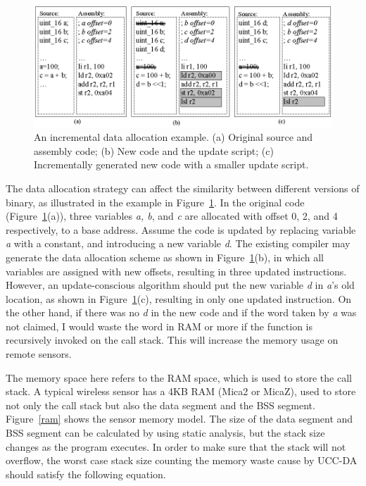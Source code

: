 \begin{figure}[htbp]
\centering
\includegraphics[width=5.5in]{figures/fdata.0.eps}
\caption[An example of incremental data allocation.]{An incremental data allocation example.
(a) Original source and assembly code;
(b) New code and the update script;
(c) Incrementally generated new code with a smaller update script.}
\label{fdata.0}
\end{figure}

The data allocation
strategy can affect the similarity between different versions of
binary, as illustrated in the example in Figure~\ref{fdata.0}.  In the
original code (Figure~\ref{fdata.0}(a)), three variables {\it a, b},
and {\it c} are allocated with offset 0, 2, and 4 respectively, to a
base address. Assume the code is updated by replacing variable {\it a}
with a constant, and introducing a new variable {\it d}. The existing
compiler may generate the data allocation scheme as shown in Figure~\ref{fdata.0}(b), in which all variables are assigned with new
offsets, resulting in three updated instructions. However, an update-conscious algorithm should put the new
variable {\it d} in {\it a}'s old location, as shown in
Figure~\ref{fdata.0}(c), resulting in only one updated instruction. 
On the other hand, if there was no {\it d} in the new code and
if the word taken by {\it a} was not claimed, I would waste the
word in RAM or more if the function is recursively
invoked on the call stack. This will increase the memory usage on remote sensors.


The memory space here refers to the RAM space, 
which is used to store the call stack. A typical wireless sensor has a
4KB RAM (Mica2 or MicaZ), used to store not only the call stack but
also the data segment and the BSS segment. Figure~\ref{ram} shows the sensor memory
model. The size of the data segment and BSS segment can be calculated
by using static analysis, but the stack size changes as the program
executes. In order to make sure that the stack will not overflow,
the worst case stack size counting the memory waste cause by UCC-DA should satisfy the following equation.

